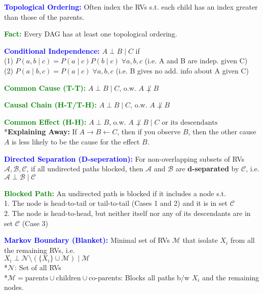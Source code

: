 \documentclass[5pt]{extarticle} %
\begin{document}
\begin{paracol}{3}
{    \textcolor{blue}{\textbf{Topological Ordering:}} Often index the RVs s.t. each child has an index greater than those of the parents. 

    \textcolor{green}{\textbf{Fact:}} Every DAG has at least one topological ordering. 

    \textcolor{blue}{\textbf{Conditional Independence:}} $A \perp B \mid C$ if \\
    (1) $P(a,b \mid c) = P(a \mid c) P(b \mid c) \; \forall a,b,c$ (i.e. A and B are indep. given C) \\
    (2) $P(a \mid b,c) = P(a \mid c) \; \forall a,b,c$ (i.e. B gives no add. info about A given C)

    \textcolor{green}{\textbf{Common Cause (T-T):}} $A \perp B \mid C$, o.w. $A \not\perp B$ 

    \textcolor{green}{\textbf{Causal Chain (H-T/T-H):}} $A \perp B \mid C$, o.w. $A \not\perp B$

    \textcolor{green}{\textbf{Common Effect (H-H):}} $A \perp B$, o.w. $A \not\perp B \mid C \text{ or its descendants}$ \\
    *\textbf{Explaining Away:} If $A \rightarrow B \leftarrow C$, then if you observe $B$, then the other cause $A$ is less likely to be the cause for the effect $B$.

    \textcolor{blue}{\textbf{Directed Separation (D-seperation):}} For non-overlapping subsets of RVs $\mathcal{A}, \mathcal{B}, \mathcal{C}$, if all undirected paths blocked, then $\mathcal{A}$ and $\mathcal{B}$ are \textbf{d-separated} by $\mathcal{C}$, i.e. $\mathcal{A} \perp \mathcal{B} \mid \mathcal{C}$

    \textcolor{green}{\textbf{Blocked Path:}} An undirected path is blocked if it includes a node s.t. \\
    1. The node is head-to-tail or tail-to-tail (Cases 1 and 2) and it is in set $\mathcal{C}$ \\
    2. The node is head-to-head, but neither itself nor any of its descendants are in set $\mathcal{C}$ (Case 3)

    \textcolor{blue}{\textbf{Markov Boundary (Blanket):}} Minimal set of RVs $\mathcal{M}$ that isolate $X_i$ from all the remaining RVs, i.e. \\
    $X_i \perp \mathcal{N} \setminus (\{X_i\} \cup \mathcal{M}) \mid \mathcal{M}$ \\
    *$\mathcal{N}$: Set of all RVs \\
    *$\mathcal{M} = \text{parents} \cup \text{children} \cup \text{co-parents}$: Blocks all paths b/w $X_i$ and the remaining nodes.

}
\end{paracol}
\end{document}
